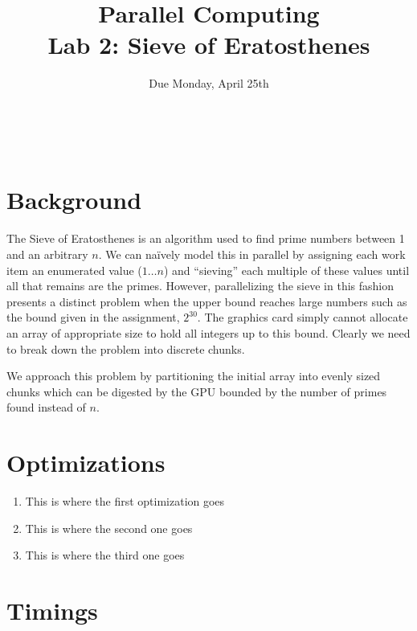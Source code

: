 \documentclass[12pt]{article}
\title{ Parallel Computing \\ Lab 2: Sieve of Eratosthenes }
\author{\MyFullName}
\date{ Due Monday, April 25th }
\begin{document}
\maketitle
\thispagestyle{empty}
\begin{center}
\end{center}
\setcounter{page}{0}
\newpage

\def\thesection{\Roman{section}.}
\hfill \\
\section{ Background }

\paragraph{}The Sieve of Eratosthenes is an algorithm used to find prime numbers between 1 and an arbitrary $n$. 
We can naïvely model this in parallel by assigning each work item an enumerated value ($1\ldots n$) and ``sieving'' each multiple of these values until all that remains are the primes. 
However, parallelizing the sieve in this fashion presents a distinct problem when the upper bound reaches large numbers such as the bound given in the assignment, $2^{30}$.
The graphics card simply cannot allocate an array of appropriate size to hold all integers up to this bound. 
Clearly we need to break down the problem into discrete chunks.

We approach this problem by partitioning the initial array into evenly sized chunks which can be digested by the GPU bounded by the number of primes found instead of $n$. 

\section{ Optimizations }
\begin{enumerate}[1.]
\item This is where the first optimization goes

\item This is where the second one goes

\item This is where the third one goes
\end{enumerate}

\section{ Timings }
\end{document}
